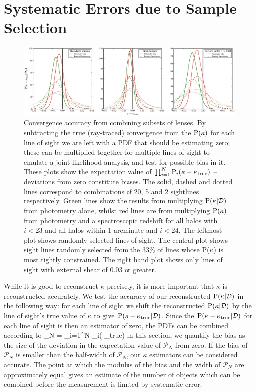 \documentclass[useAMS,usenatbib]{mn2e}
\begin{document}


\section{Systematic Errors due to Sample Selection}
\label{sec:bias}

\begin{figure}
\includegraphics[width=\textwidth]{figs/biasplots.eps}
\caption{Convergence accuracy from combining subsets of
lenses. By subtracting the true (ray-traced) convergence from the
\infered ${\rm P}(\kappa)$ for each line of sight we are left with a PDF that
should be estimating zero; these can be multiplied together for multiple
lines of sight to emulate a joint likelihood analysis, and 
test for possible bias in it. These plots show the
expectation value of $\prod_{i=1}^N {\rm P}_i(\kappa-\kappa_{\rm true})$ --
deviations from zero constitute biases. The solid, dashed and dotted
lines correspond to combinations of 
20, 5 and 2 sightlines respectively. Green lines show the results
from multiplying ${\rm P}(\kappa|{\mathcal{D}})$ \infered from photometry alone, whilst red
lines are from multiplying ${\rm P}(\kappa)$ \infered from photometry and a
spectroscopic redshift for all halos with $i<23$ and all halos within 1
arcminute and $i<24$. The leftmost plot shows randomly selected lines
of sight. The central plot shows sight lines randomly selected from the
33\% of lines whose P($\kappa$) is most tightly constrained. The right
hand plot shows only lines of sight with external shear of 0.03 or
greater.}
\label{fig:biasplots}
\end{figure}

While it is good to reconstruct $\kappa$ precisely, it is more important that
$\kappa$ is reconstructed accurately. 
We test the accuracy of our reconstructed ${\rm P}(\kappa|{\mathcal{D}})$ in the following
way: for each line of sight we shift the reconstructed ${\rm P}(\kappa|{\mathcal{D}})$ by
the line of sight's true value of $\kappa$ to give
${\rm P}(\kappa-\kappa_{\rm true}|{\mathcal{D}})$. Since the ${\rm P}(\kappa-\kappa_{\rm true}|{\mathcal{D}})$ for
each line of sight is then an \independant estimator of zero, the PDFs can be
combined according to
\be
\label{eq:bias}
_N = \prod_{i=1}^N \pr_i(\kappa-\kappa_{\rm true})
\ee
In this section, we quantify the bias as the size of the deviation in the
expectation value of $\mathcal{P}_N$ from zero. If the bias of $\mathcal{P}_N$
is smaller than the half-width of $\mathcal{P}_N$, our $\kappa$ estimators can
be considered accurate. 
The point at which the modulus of the bias and the width of $\mathcal{P}_N$
are approximately equal gives an estimate of the number of objects which can
be combined before the measurement is limited by systematic error.
\end{document}
